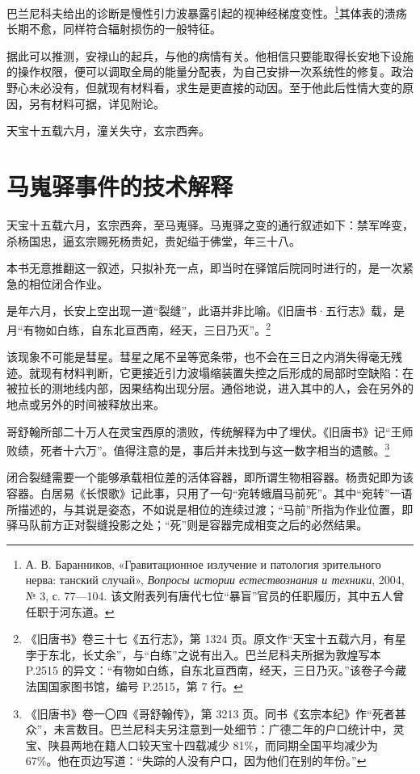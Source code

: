 巴兰尼科夫给出的诊断是慢性引力波暴露引起的视神经梯度变性。\footnote{А. В. Баранников, «Гравитационное излучение и патология зрительного нерва: танский случай», \textit{Вопросы истории естествознания и техники}, 2004, № 3, с. 77—104. 该文附表列有唐代七位“暴盲”官员的任职履历，其中五人曾任职于河东道。}其体表的溃疡长期不愈，同样符合辐射损伤的一般特征。

据此可以推测，安禄山的起兵，与他的病情有关。他相信只要能取得长安地下设施的操作权限，便可以调取全局的能量分配表，为自己安排一次系统性的修复。政治野心未必没有，但就现有材料看，求生是更直接的动因。至于他此后性情大变的原因，另有材料可据，详见附论。


天宝十五载六月，潼关失守，玄宗西奔。


\section{马嵬驿事件的技术解释}

天宝十五载六月，玄宗西奔，至马嵬驿。马嵬驿之变的通行叙述如下：禁军哗变，杀杨国忠，逼玄宗赐死杨贵妃，贵妃缢于佛堂，年三十八。

本书无意推翻这一叙述，只拟补充一点，即当时在驿馆后院同时进行的，是一次紧急的相位闭合作业。

是年六月，长安上空出现一道“裂缝”，此语并非比喻。《旧唐书·五行志》载，是月“有物如白练，自东北亘西南，经天，三日乃灭”。\footnote{《旧唐书》卷三十七《五行志》，第 1324 页。原文作“天宝十五载六月，有星孛于东北，长丈余”，与“白练”之说有出入。巴兰尼科夫所据为敦煌写本 P.2515 的异文：“有物如白练，自东北亘西南，经天，三日乃灭。”该卷子今藏法国国家图书馆，编号 P.2515，第 7 行。}

该现象不可能是彗星。彗星之尾不呈等宽条带，也不会在三日之内消失得毫无残迹。就现有材料判断，它更接近引力波塌缩装置失控之后形成的局部时空缺陷：在被拉长的测地线内部，因果结构出现分层。通俗地说，进入其中的人，会在另外的地点或另外的时间被释放出来。

哥舒翰所部二十万人在灵宝西原的溃败，传统解释为中了埋伏。《旧唐书》记“王师败绩，死者十六万”。值得注意的是，事后并未找到与这一数字相当的遗骸。\footnote{《旧唐书》卷一〇四《哥舒翰传》，第 3213 页。同书《玄宗本纪》作“死者甚众”，未言数目。巴兰尼科夫另注意到一处细节：广德二年的户口统计中，灵宝、陕县两地在籍人口较天宝十四载减少 81\%，而同期全国平均减少为 67\%。他在页边写道：“失踪的人没有户口，因为他们在别的年份。”}

闭合裂缝需要一个能够承载相位差的活体容器，即所谓生物相容器。杨贵妃即为该容器。白居易《长恨歌》记此事，只用了一句“宛转蛾眉马前死”。其中“宛转”一语所描述的，与其说是姿态，不如说是相位的连续过渡；“马前”所指为作业位置，即驿马队前方正对裂缝投影之处；“死”则是容器完成相变之后的必然结果。

